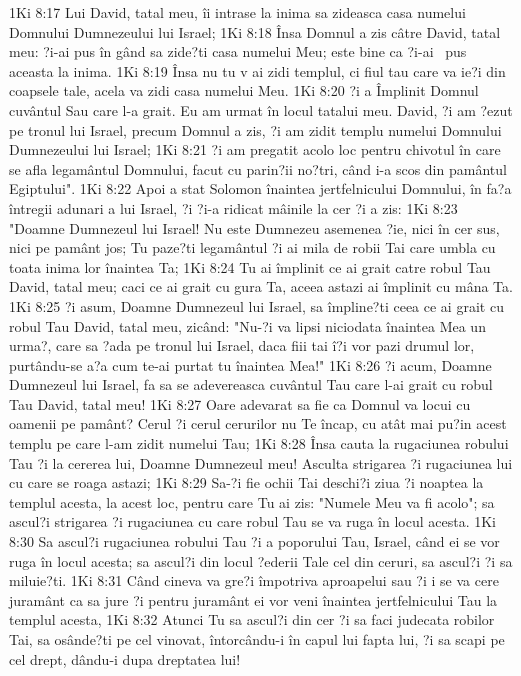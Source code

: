 1Ki 8:17  Lui David, tatal meu, îi intrase la inima sa zideasca casa numelui Domnului Dumnezeului lui Israel;
1Ki 8:18  Însa Domnul a zis câtre David, tatal meu: ?i-ai pus în gând sa zide?ti casa numelui Meu; este bine ca ?i-ai  pus aceasta la inima.
1Ki 8:19  Însa nu tu v ai zidi templul, ci fiul tau care va ie?i din coapsele tale, acela va zidi casa numelui Meu.
1Ki 8:20  ?i a Împlinit Domnul cuvântul Sau care l-a grait. Eu am urmat în locul tatalui meu. David, ?i am ?ezut pe tronul lui Israel, precum Domnul a zis, ?i am zidit templu numelui Domnului Dumnezeului lui Israel;
1Ki 8:21  ?i am pregatit acolo loc pentru chivotul în care se afla legamântul Domnului, facut cu parin?ii no?tri, când i-a scos din pamântul Egiptului".
1Ki 8:22  Apoi a stat Solomon înaintea jertfelnicului Domnului, în fa?a întregii adunari a lui Israel, ?i ?i-a ridicat mâinile la cer ?i a zis:
1Ki 8:23  "Doamne Dumnezeul lui Israel! Nu este Dumnezeu asemenea ?ie, nici în cer sus, nici pe pamânt jos; Tu paze?ti legamântul ?i ai mila de robii Tai care umbla cu toata inima lor înaintea Ta;
1Ki 8:24  Tu ai împlinit ce ai grait catre robul Tau David, tatal meu; caci ce ai grait cu gura Ta, aceea astazi ai împlinit cu mâna Ta.
1Ki 8:25  ?i asum, Doamne Dumnezeul lui Israel, sa împline?ti ceea ce ai grait cu robul Tau David, tatal meu, zicând: "Nu-?i va lipsi niciodata înaintea Mea un urma?, care sa ?ada pe tronul lui Israel, daca fiii tai î?i vor pazi drumul lor, purtându-se a?a cum te-ai purtat tu înaintea Mea!"
1Ki 8:26  ?i acum, Doamne Dumnezeul lui Israel, fa sa se adevereasca cuvântul Tau care l-ai grait cu robul Tau David, tatal meu!
1Ki 8:27  Oare adevarat sa fie ca Domnul va locui cu oamenii pe pamânt? Cerul ?i cerul cerurilor nu Te încap, cu atât mai pu?in acest templu pe care l-am zidit numelui Tau;
1Ki 8:28  Însa cauta la rugaciunea robului Tau ?i la cererea lui, Doamne Dumnezeul meu! Asculta strigarea ?i rugaciunea lui cu care se roaga astazi;
1Ki 8:29  Sa-?i fie ochii Tai deschi?i ziua ?i noaptea la templul acesta, la acest loc, pentru care Tu ai zis: "Numele Meu va fi acolo"; sa ascul?i strigarea ?i rugaciunea cu care robul Tau se va ruga în locul acesta.
1Ki 8:30  Sa ascul?i rugaciunea robului Tau ?i a poporului Tau, Israel, când ei se vor ruga în locul acesta; sa ascul?i din locul ?ederii Tale cel din ceruri, sa ascul?i ?i sa miluie?ti.
1Ki 8:31  Când cineva va gre?i împotriva aproapelui sau ?i i se va cere juramânt ca sa jure ?i pentru juramânt ei vor veni înaintea jertfelnicului Tau la templul acesta,
1Ki 8:32  Atunci Tu sa ascul?i din cer ?i sa faci judecata robilor Tai, sa osânde?ti pe cel vinovat, întorcându-i în capul lui fapta lui, ?i sa scapi pe cel drept, dându-i dupa dreptatea lui!
